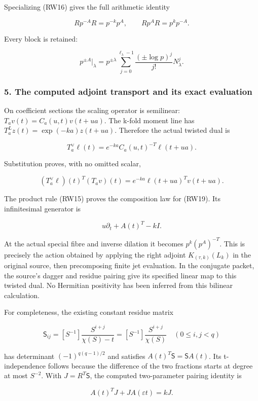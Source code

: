 Specializing (RW16) gives the full arithmetic identity

\[
R p^{-A} R=p^{-k}p^A,
\qquad R p^A R=p^k p^{-A}.
\tag{RW17}
\]

Every block is retained:

\[
p^{\pm A}|_{\lambda}
=p^{\pm\lambda}\sum_{j=0}^{\ell_\lambda-1}
\frac{(\pm\log p)^j}{j!}N_\lambda^j.
\tag{RW18}
\]

\subsubsection{5. The computed adjoint transport and its exact evaluation}\label{endpoint-f1_reflection--the-computed-adjoint-transport-and-its-exact-evaluation}

On coefficient sections the scaling operator is semilinear: \(T_av(t)=C_a(u,t)v(t+ua)\). The k-fold moment line has \(T_a^Lz(t)=\exp(-ka)z(t+ua)\). Therefore the actual twisted dual is

\[
\boxed{T_a^\vee\ell(t)
=e^{-ka}C_a(u,t)^{-T}\ell(t+ua).}
\tag{RW19}
\]

Substitution proves, with no omitted scalar,

\[
(T_a^\vee\ell)(t)^T(T_av)(t)
=e^{-ka}\ell(t+ua)^Tv(t+ua).
\tag{RW20}
\]

The product rule (RW15) proves the composition law for (RW19). Its infinitesimal generator is

\[
u\partial_t+A(t)^T-kI.
\tag{RW21}
\]

At the actual special fibre and inverse dilation it becomes \(p^k(p^A)^{-T}\). This is precisely the action obtained by applying the right adjoint \(K_{(\tau,k)}(L_k)\) in the original source, then precomposing finite jet evaluation. In the conjugate packet, the source's dagger and residue pairing give its specified linear map to this twisted dual. No Hermitian positivity has been inferred from this bilinear calculation.

For completeness, the existing constant residue matrix

\[
\mathsf S_{ij}=[S^{-1}]\frac{S^{i+j}}{\chi(S)-t}
=[S^{-1}]\frac{S^{i+j}}{\chi(S)}
\quad(0\le i,j<q)
\tag{RW22}
\]

has determinant \((-1)^{q(q-1)/2}\) and satisfies \(A(t)^T\mathsf S=\mathsf SA(t)\). Its t-independence follows because the difference of the two fractions starts at degree at most \(S^{-2}\). With \(J=R^T\mathsf S\), the computed two-parameter pairing identity is

\[
\boxed{A(t)^T J+J A(\varepsilon t)=kJ.}
\tag{RW23}
\]


